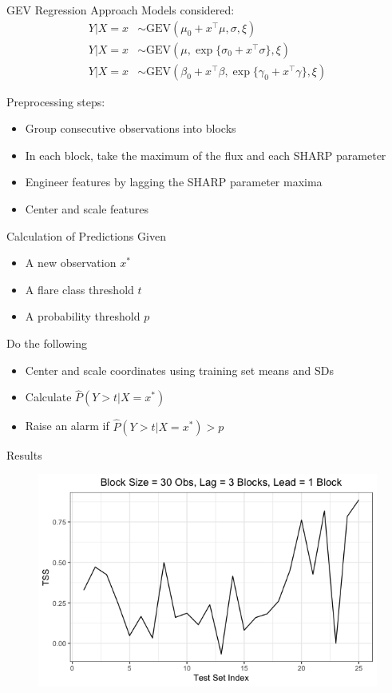\documentclass{beamer}
\begin{document}
\begin{frame}{GEV Regression Approach}
    Models considered:
    \begin{align*}
        Y | X = x &\sim \text{GEV}(\mu_0 + x^{\top}\mu, \sigma, \xi) \\
        Y | X = x &\sim \text{GEV}(\mu, \exp\{\sigma_0 + x^{\top}\sigma\}, \xi) \\
        Y | X = x &\sim \text{GEV}(\beta_0 + x^{\top}\beta, \exp\{\gamma_0 + x^{\top}\gamma\}, \xi)
    \end{align*}

    Preprocessing steps:
    \begin{itemize}
        \item Group consecutive observations into blocks
        \item In each block, take the maximum of the flux and each SHARP parameter
        \item Engineer features by lagging the SHARP parameter maxima
        \item Center and scale features
    \end{itemize}    
\end{frame}

\begin{frame}{Calculation of Predictions}
    Given
    \begin{itemize}
        \item A new observation $x^*$
        \item A flare class threshold $t$
        \item A probability threshold $p$
    \end{itemize}
    Do the following    
    \begin{itemize}
        \item Center and scale coordinates using training set means and SDs
        \item Calculate $\hat{P}(Y > t | X = x^*)$
        \item Raise an alarm if $\hat{P}(Y > t | X = x^*) > p$
    \end{itemize}
\end{frame}

\begin{frame}{Results}
    \begin{figure}
        \centering
        \includegraphics[scale=0.5]{tss_ts.png}
        \label{fig:tss_ts}
    \end{figure}
\end{frame}
\end{document}
